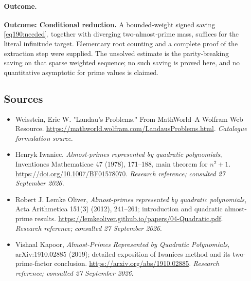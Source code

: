 \documentclass[11pt,a4paper]{article}
\numberwithin{equation}{section}
\begin{document}
\paragraph{Outcome.}
\textbf{Outcome: Conditional reduction.}
A bounded-weight signed saving \eqref{eq190:needed}, together with diverging two-almost-prime mass, suffices for the literal infinitude target. Elementary root counting and a complete proof of the extraction step were supplied. The unsolved estimate is the parity-breaking saving on that sparse weighted sequence; no such saving is proved here, and no quantitative asymptotic for prime values is claimed.

\subsection{Sources}
\begin{itemize}\raggedright
\item[\textnormal{[S1]}]\hypertarget{source:statement:1}{} Weisstein, Eric W. "Landau's Problems." From MathWorld--A Wolfram Web Resource.
\url{https://mathworld.wolfram.com/LandausProblems.html}.
{\small\textit{Catalogue formulation source.}}
\item[\textnormal{[E1]}]\hypertarget{extra:statement:1}{} Henryk Iwaniec, \emph{Almost-primes represented by quadratic polynomials}, Inventiones Mathematicae 47 (1978), 171--188, main theorem for $n^2+1$.
\url{https://doi.org/10.1007/BF01578070}.
{\small\textit{Research reference; consulted 27 September 2026.}}
\item[\textnormal{[E2]}]\hypertarget{extra:statement:2}{} Robert J. Lemke Oliver, \emph{Almost-primes represented by quadratic polynomials}, Acta Arithmetica 151(3) (2012), 241--261; introduction and quadratic almost-prime results.
\url{https://lemkeoliver.github.io/papers/04-Quadratic.pdf}.
{\small\textit{Research reference; consulted 27 September 2026.}}
\item[\textnormal{[E3]}]\hypertarget{extra:statement:3}{} Vishaal Kapoor, \emph{Almost-Primes Represented by Quadratic Polynomials}, arXiv:1910.02885 (2019); detailed exposition of Iwaniec\textquotesingle s method and its two-prime-factor conclusion.
\url{https://arxiv.org/abs/1910.02885}.
{\small\textit{Research reference; consulted 27 September 2026.}}
\end{itemize}
\end{document}
